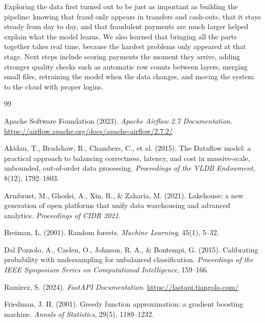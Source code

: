\documentclass[11pt,a4paper]{article}
\begin{document}
Exploring the data first turned out to be just as important as building the
pipeline: knowing that fraud only appears in transfers and cash-outs, that it
stays steady from day to day, and that fraudulent payments are much larger helped
explain what the model learns. We also learned that bringing all the parts
together takes real time, because the hardest problems only appeared at that
stage. Next steps include scoring payments the moment they arrive, adding
stronger quality checks such as automatic row counts between layers, merging
small files, retraining the model when the data changes, and moving the system
to the cloud with proper logins.

\begin{thebibliography}{99}

Apache Software Foundation (2023). \emph{Apache Airflow 2.7 Documentation}.
\url{https://airflow.apache.org/docs/apache-airflow/2.7.2/}

Akidau, T., Bradshaw, R., Chambers, C., et al. (2015). The Dataflow model: a
practical approach to balancing correctness, latency, and cost in massive-scale,
unbounded, out-of-order data processing. \emph{Proceedings of the VLDB
Endowment}, 8(12), 1792--1803.

Armbrust, M., Ghodsi, A., Xin, R., \& Zaharia, M. (2021). Lakehouse: a new
generation of open platforms that unify data warehousing and advanced analytics.
\emph{Proceedings of CIDR 2021}.

Breiman, L. (2001). Random forests. \emph{Machine Learning}, 45(1), 5--32.

Dal Pozzolo, A., Caelen, O., Johnson, R. A., \& Bontempi, G. (2015). Calibrating
probability with undersampling for unbalanced classification. \emph{Proceedings
of the IEEE Symposium Series on Computational Intelligence}, 159--166.

Ram\'{\i}rez, S. (2024). \emph{FastAPI Documentation}.
\url{https://fastapi.tiangolo.com/}

Friedman, J. H. (2001). Greedy function approximation: a gradient boosting
machine. \emph{Annals of Statistics}, 29(5), 1189--1232.


\end{thebibliography}
\end{document}
